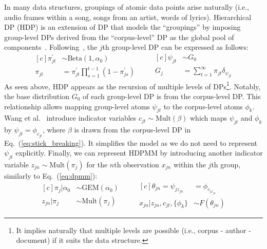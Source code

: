 \documentclass{article}
\begin{document}
In many data structures, groupings of atomic data points arise naturally (i.e., audio frames within a song, songs from an artist, words of lyrics). Hierarchical DP (HDP) is an extension of DP that models the ``groupings'' by imposing group-level DPs derived from the ``corpus-level'' DP as the global pool of components~\cite{doi:10.1198/016214506000000302}. Following~\cite{DBLP:journals/jmlr/WangPB11}, the $j$th group-level DP can be expressed as follows:
\begin{equation}\label{eq:hdp_doc_level}
\begin{aligned}[c]
    \pi^{\prime}_{jt} &\sim \text{Beta}(1, \alpha_{0}) \\
    \pi_{jt} &= \pi^{\prime}_{jt} \prod^{t - 1}_{s = 1} (1 - \pi^{\prime}_{js})
\end{aligned}
\qquad
\begin{aligned}[c]
    \psi_{jt} &\sim G_{0} \\
    G_{j} &= \sum^{\infty}_{t = 1} \pi_{jt}\delta_{\psi_{jt}}
\end{aligned}
\end{equation}
As seen above, HDP appears as the recursion of multiple levels of DPs\footnote{It implies naturally that multiple levels are possible (i.e., corpus - author - document) if it suits the data structure.}. Notably, the base distribution $G_{0}$ of each group-level DP is from the corpus-level DP. This relationship allows mapping group-level atoms $\psi_{jt}$ to the corpus-level atoms $\phi_{k}$. Wang et al.~\cite{DBLP:journals/jmlr/WangPB11} introduce indicator variables $c_{jt}\sim\text{Mult}(\beta)$ which maps $\psi_{jt}$ and $\phi_{k}$ by $\psi_{jt}=\phi_{c_{jt}}$, where $\beta$ is drawn from the corpus-level DP in Eq.\ (\ref{eq:stick_breaking}). It simplifies the model as we do not need to represent $\psi_{jt}$ explicitly.
Finally, we can represent HDPMM by introducing another indicator variable $z_{jn} \sim \text{Mult}(\pi_{j})$ for the $n$th observation $x_{jn}$ within the $j$th group, similarly to Eq.\ (\ref{eq:dpmm}):
\begin{equation}\label{eq:hdpmm}
\begin{aligned}[c]
    \pi_{j}|\alpha_{0} &\sim \text{GEM}(\alpha_{0}) \\
    z_{jn}|\pi_{j} &\sim \text{Mult}(\pi_{j})
\end{aligned}
\qquad
\begin{aligned}[c]
    \theta_{jn} = \psi_{jz_{jn}} &= \phi_{c_{jz_{jn}}}  \\
    x_{jn}|z_{jn}, c_{jt}, \{\phi_{k}\} &\sim F(\theta_{jn}) 
\end{aligned}
\end{equation}
\end{document}
